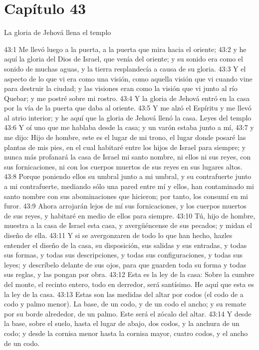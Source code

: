 \section*{Capítulo 43 } 
La gloria de Jehová llena el templo   
  
43:1 Me llevó luego a la puerta, a la puerta que mira hacia el oriente;   
43:2 y he aquí la gloria del Dios de Israel, que venía del oriente; y su sonido era como el sonido de muchas aguas, y la tierra resplandecía a causa de su gloria.   
43:3 Y el aspecto de lo que vi era como una visión, como aquella visión que vi cuando vine para destruir la ciudad; y las visiones eran como la visión que vi junto al río Quebar; y me postré sobre mi rostro.   
43:4 Y la gloria de Jehová entró en la casa por la vía de la puerta que daba al oriente.   
43:5 Y me alzó el Espíritu y me llevó al atrio interior; y he aquí que la gloria de Jehová llenó la casa.   
Leyes del templo   
43:6 Y oí uno que me hablaba desde la casa; y un varón estaba junto a mí,   
43:7 y me dijo: Hijo de hombre, este es el lugar de mi trono, el lugar donde posaré las plantas de mis pies, en el cual habitaré entre los hijos de Israel para siempre; y nunca más profanará la casa de Israel mi santo nombre, ni ellos ni sus reyes, con sus fornicaciones, ni con los cuerpos muertos de sus reyes en sus lugares altos.   
43:8 Porque poniendo ellos su umbral junto a mi umbral, y su contrafuerte junto a mi contrafuerte, mediando sólo una pared entre mí y ellos, han contaminado mi santo nombre con sus abominaciones que hicieron; por tanto, los consumí en mi furor.   
43:9 Ahora arrojarán lejos de mí sus fornicaciones, y los cuerpos muertos de sus reyes, y habitaré en medio de ellos para siempre.   
43:10 Tú, hijo de hombre, muestra a la casa de Israel esta casa, y avergüéncense de sus pecados; y midan el diseño de ella.   
43:11 Y si se avergonzaren de todo lo que han hecho, hazles entender el diseño de la casa, su disposición, sus salidas y sus entradas, y todas sus formas, y todas sus descripciones, y todas sus configuraciones, y todas sus leyes; y descríbelo delante de sus ojos, para que guarden toda su forma y todas sus reglas, y las pongan por obra.   
43:12 Esta es la ley de la casa: Sobre la cumbre del monte, el recinto entero, todo en derredor, será santísimo. He aquí que esta es la ley de la casa.   
43:13 Estas son las medidas del altar por codos   (el codo de a codo y palmo menor). La base, de un codo, y de un codo el ancho; y su remate por su borde alrededor, de un palmo. Este será el zócalo del altar.   
43:14 Y desde la base, sobre el suelo, hasta el lugar de abajo, dos codos, y la anchura de un codo; y desde la cornisa menor hasta la cornisa mayor, cuatro codos, y el ancho de un codo.   
